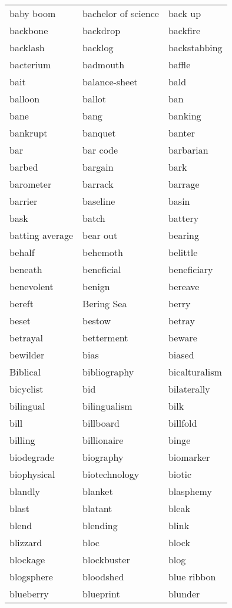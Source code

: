\documentclass{minimal}
\begin{document}
\begin{longtable}{p{2.8cm}p{2.8cm}p{2.8cm}}
baby boom & bachelor of science & back up \\
backbone & backdrop & backfire \\
backlash & backlog & backstabbing \\
bacterium & badmouth & baffle \\
bait & balance-sheet & bald \\
balloon & ballot & ban \\
bane & bang & banking \\
bankrupt & banquet & banter \\
bar & bar code & barbarian \\
barbed & bargain & bark \\
barometer & barrack & barrage \\
barrier & baseline & basin \\
bask & batch & battery \\
batting average & bear out & bearing \\
behalf & behemoth & belittle \\
beneath & beneficial & beneficiary \\
benevolent & benign & bereave \\
bereft & Bering Sea & berry \\
beset & bestow & betray \\
betrayal & betterment & beware \\
bewilder & bias & biased \\
Biblical & bibliography & bicalturalism \\
bicyclist & bid & bilaterally \\
bilingual & bilingualism & bilk \\
bill & billboard & billfold \\
billing & billionaire & binge \\
biodegrade & biography & biomarker \\
biophysical & biotechnology & biotic \\
blandly & blanket & blasphemy \\
blast & blatant & bleak \\
blend & blending & blink \\
blizzard & bloc & block \\
blockage & blockbuster & blog \\
blogsphere & bloodshed & blue ribbon \\
blueberry & blueprint & blunder \\

\end{longtable}
\end{document}
